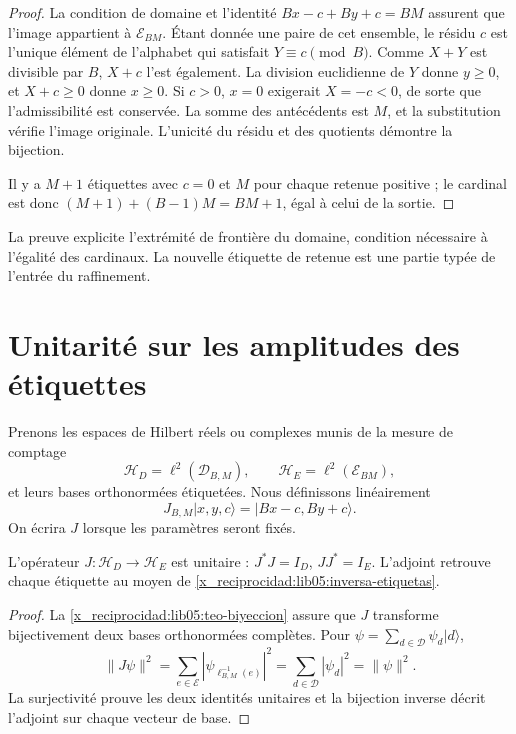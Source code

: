 \begin{proof}
La condition de domaine et l'identité \(Bx-c+By+c=BM\) assurent que l'image appartient à \(\mathcal E_{BM}\). Étant donnée une paire de cet ensemble, le résidu \(c\) est l'unique élément de l'alphabet qui satisfait \(Y\equiv c\pmod B\). Comme \(X+Y\) est divisible par \(B\), \(X+c\) l'est également. La division euclidienne de \(Y\) donne \(y\geq0\), et \(X+c\geq0\) donne \(x\geq0\). Si \(c>0\), \(x=0\) exigerait \(X=-c<0\), de sorte que l'admissibilité est conservée. La somme des antécédents est \(M\), et la substitution vérifie l'image originale. L'unicité du résidu et des quotients démontre la bijection.

Il y a \(M+1\) étiquettes avec \(c=0\) et \(M\) pour chaque retenue
positive ; le cardinal est donc
\((M+1)+(B-1)M=BM+1\), égal à celui de la sortie.
\end{proof}

La preuve explicite l’extrémité de frontière du domaine, condition
nécessaire à l’égalité des cardinaux. La nouvelle étiquette de retenue
est une partie typée de l’entrée du raffinement.

\section{Unitarité sur les amplitudes des étiquettes}
\label{x_reciprocidad:lib05:unitariedad}

Prenons les espaces de Hilbert réels ou complexes munis de la mesure de comptage
\begin{equation}
 \mathscr H_D=\ell^2(\mathcal D_{B,M}),\qquad
 \mathscr H_E=\ell^2(\mathcal E_{BM}),
 \label{x_reciprocidad:lib05:hilbert}
\end{equation}
et leurs bases orthonormées étiquetées. Nous définissons linéairement
\begin{equation}
 J_{B,M}|x,y,c\rangle=|Bx-c,By+c\rangle.
 \label{x_reciprocidad:lib05:j}
\end{equation}
On écrira \(J\) lorsque les paramètres seront fixés.

\begin{proposition}
\label{x_reciprocidad:lib05:prop-unitaria}
L’opérateur \(J:\mathscr H_D\to\mathscr H_E\) est unitaire :
\(J^*J=I_D\), \(JJ^*=I_E\). L’adjoint retrouve chaque étiquette
au moyen de \eqref{x_reciprocidad:lib05:inversa-etiquetas}.
\end{proposition}

\begin{proof}
La \cref{x_reciprocidad:lib05:teo-biyeccion} assure que \(J\) transforme
bijectivement deux bases orthonormées complètes. Pour
\(\psi=\sum_{d\in\mathcal D}\psi_d|d\rangle\),
\[
 \|J\psi\|^2
 =\sum_{e\in\mathcal E}|\psi_{\ell_{B,M}^{-1}(e)}|^2
 =\sum_{d\in\mathcal D}|\psi_d|^2=\|\psi\|^2.
\]
La surjectivité prouve les deux identités unitaires et la
bijection inverse décrit l’adjoint sur chaque vecteur de base.
\end{proof}

